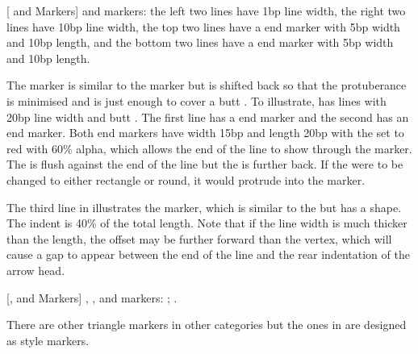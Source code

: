 {}
[ and  Markers]
{ and  markers:
the left two lines have 1bp line width,
the right two lines have 10bp line width,
the top two lines have a  end marker
with 5bp width and 10bp length, and
the bottom two lines have a  end marker
with 5bp width and 10bp length.}

The  marker is similar to the
 marker but is shifted back so that the
protuberance is minimised and is just enough to cover a butt 
. To illustrate, 
has lines with 20bp line width and butt .
The first line has a  end marker and the
second has an  end marker. Both end
markers have width 15bp and length 20bp with the  set
to red with 60\% alpha, which allows the end of the line to show
through the marker. The  is flush
against the end of the line but the 
is further back. If the  were to be changed to
either rectangle or round, it would protrude into the marker.

The third line in 
illustrates the  marker, which is similar to
the  but has a 
shape. The indent is 40\% of the total length. Note that if the line
width is much thicker than the length, the offset may be further
forward than the vertex, which will cause a gap to appear between
the end of the line and the rear indentation of the arrow head.

{}
[,
 and
 Markers]
{,
, and
 markers:
 ;
 
 .}

\begin{information}
There are other triangle markers in other categories but
the ones in  are designed as  style
markers.
\end{information}

